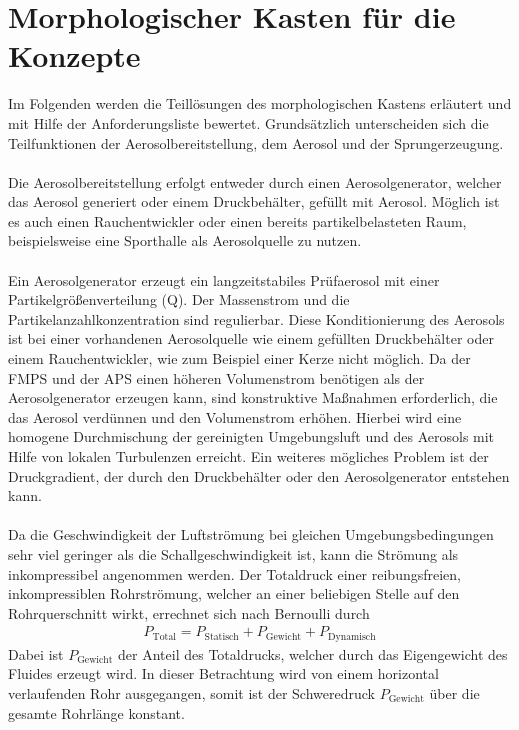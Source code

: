 \section{Morphologischer Kasten f\"{u}r die Konzepte}
Im Folgenden werden die Teill\"{o}sungen des morphologischen Kastens erl\"{a}utert und mit Hilfe der Anforderungsliste bewertet. Grunds\"{a}tzlich unterscheiden sich die Teilfunktionen der Aerosolbereitstellung, dem Aerosol und der Sprungerzeugung.
\\\\
Die Aerosolbereitstellung erfolgt entweder durch einen Aerosolgenerator, welcher das Aerosol generiert oder einem Druckbeh\"{a}lter, gef\"{u}llt mit Aerosol. M\"{o}glich ist es auch einen Rauchentwickler oder einen bereits partikelbelasteten Raum, beispielsweise eine Sporthalle als Aerosolquelle zu nutzen.
\\\\
Ein Aerosolgenerator erzeugt ein langzeitstabiles Pr\"{u}faerosol mit einer Partikelgr\"{o}{\ss}enverteilung (Q). Der Massenstrom und die Partikelanzahlkonzentration sind regulierbar. Diese Konditionierung des Aerosols ist bei einer vorhandenen Aerosolquelle wie einem gef\"{u}llten Druckbeh\"{a}lter oder einem Rauchentwickler, wie zum Beispiel einer Kerze nicht m\"{o}glich. Da der FMPS und der APS einen h\"{o}heren Volumenstrom ben\"{o}tigen als der Aerosolgenerator erzeugen kann, sind konstruktive Ma{\ss}nahmen erforderlich, die das Aerosol verd\"{u}nnen und den Volumenstrom erh\"{o}hen. Hierbei wird eine homogene Durchmischung der gereinigten Umgebungsluft und des Aerosols mit Hilfe von lokalen Turbulenzen erreicht. Ein weiteres m\"{o}gliches Problem ist der Druckgradient, der durch den Druckbeh\"{a}lter oder den Aerosolgenerator entstehen kann.
\\\\
Da die Geschwindigkeit der Luftstr\"{o}mung bei gleichen Umgebungsbedingungen sehr viel geringer als die Schallgeschwindigkeit ist, kann die Str\"{o}mung als inkompressibel angenommen werden. Der Totaldruck einer reibungsfreien, inkompressiblen Rohrstr\"{o}mung, welcher an einer beliebigen Stelle auf den Rohrquerschnitt wirkt, errechnet sich nach Bernoulli durch
\begin{align*}
	P_\text{Total} = P_\text{Statisch} + P_\text{Gewicht} + P_\text{Dynamisch}
\end{align*}
Dabei ist \(P_\text{Gewicht}\) der Anteil des Totaldrucks, welcher durch das Eigengewicht des Fluides erzeugt wird. In dieser Betrachtung wird von einem horizontal verlaufenden Rohr ausgegangen, somit ist der Schweredruck \(P_\text{Gewicht}\) \"{u}ber die gesamte Rohrl\"{a}nge konstant.
